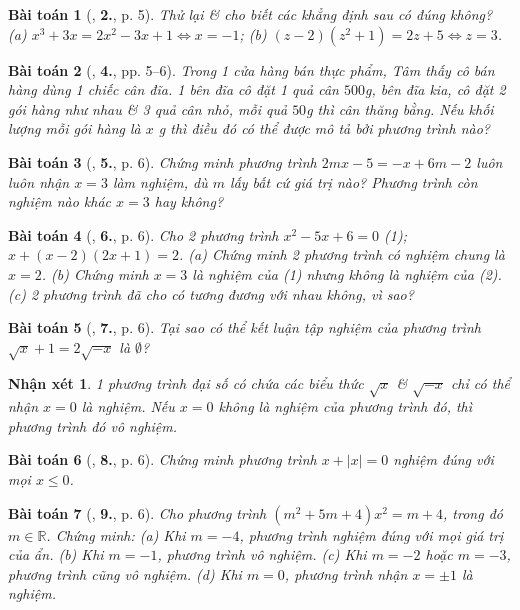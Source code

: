 \documentclass{article}
\numberwithin{equation}{section}
\newtheorem{baitoan}{Bài toán}
\newtheorem{nhanxet}{Nhận xét}[section]
\begin{document}
\begin{baitoan}[\cite{SBT_Toan_8_tap_2}, \textbf{2.}, p. 5]
	Thử lại \& cho biết các khẳng định sau có đúng không? (a) $x^3 + 3x = 2x^2 - 3x + 1\Leftrightarrow x = -1$; (b) $(z - 2)(z^2 + 1) = 2z + 5\Leftrightarrow z = 3$.
\end{baitoan}

\begin{baitoan}[\cite{SBT_Toan_8_tap_2}, \textbf{4.}, pp. 5--6]
	Trong 1 cửa hàng bán thực phẩm, Tâm thấy cô bán hàng dùng 1 chiếc cân đĩa. 1 bên đĩa cô đặt 1 quả cân $500$\emph{g}, bên đĩa kia, cô đặt 2 gói hàng như nhau \& 3 quả cân nhỏ, mỗi quả $50$\emph{g} thì cân thăng bằng. Nếu khối lượng mỗi gói hàng là $x$ \emph{g} thì điều đó có thể được mô tả bởi phương trình nào?
\end{baitoan}

\begin{baitoan}[\cite{SBT_Toan_8_tap_2}, \textbf{5.}, p. 6]
	Chứng minh phương trình $2mx - 5 = -x + 6m - 2$ luôn luôn nhận $x = 3$ làm nghiệm, dù $m$ lấy bất cứ giá trị nào? Phương trình còn nghiệm nào khác $x = 3$ hay không?
\end{baitoan}

\begin{baitoan}[\cite{SBT_Toan_8_tap_2}, \textbf{6.}, p. 6]
	Cho 2 phương trình $x^2 - 5x + 6 = 0$ (1); $x + (x - 2)(2x + 1) = 2$. (a) Chứng minh 2 phương trình có nghiệm chung là $x = 2$. (b) Chứng minh $x = 3$ là nghiệm của (1) nhưng không là nghiệm của (2). (c) 2 phương trình đã cho có tương đương với nhau không, vì sao?
\end{baitoan}

\begin{baitoan}[\cite{SBT_Toan_8_tap_2}, \textbf{7.}, p. 6]
	Tại sao có thể kết luận tập nghiệm của phương trình $\sqrt{x} + 1 = 2\sqrt{-x}$ là $\emptyset$?
\end{baitoan}

\begin{nhanxet}
	1 phương trình đại số có chứa các biểu thức $\sqrt{x}$ \& $\sqrt{-x}$ chỉ có thể nhận $x = 0$ là nghiệm. Nếu $x = 0$ không là nghiệm của phương trình đó, thì phương trình đó vô nghiệm.
\end{nhanxet}

\begin{baitoan}[\cite{SBT_Toan_8_tap_2}, \textbf{8.}, p. 6]
	Chứng minh phương trình $x + |x| = 0$ nghiệm đúng với mọi $x\le0$.
\end{baitoan}

\begin{baitoan}[\cite{SBT_Toan_8_tap_2}, \textbf{9.}, p. 6]
	Cho phương trình $(m^2 + 5m + 4)x^2 = m + 4$, trong đó $m\in\mathbb{R}$. Chứng minh: (a) Khi $m = -4$, phương trình nghiệm đúng với mọi giá trị của ẩn. (b) Khi $m = -1$, phương trình vô nghiệm. (c) Khi $m = -2$ hoặc $m = -3$, phương trình cũng vô nghiệm. (d) Khi $m = 0$, phương trình nhận $x = \pm1$ là nghiệm.
\end{baitoan}
\end{document}
